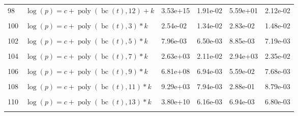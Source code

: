 \documentclass[12pt,a4paper]{article}
\DeclareMathOperator{\bc}{bc}
\DeclareMathOperator{\poly}{poly}
\begin{document}
\begin{longtable}[t]{ll>{\raggedleft\arraybackslash}p{2cm}>{\raggedleft\arraybackslash}p{2cm}>{\raggedleft\arraybackslash}p{2cm}>{\raggedleft\arraybackslash}p{2cm}}
98 & $\log(p) = c + \poly\left( \bc(t), 12 \right) + k$ & 3.53e+15 & 1.91e-02 & 5.59e+01 & 2.12e-02\\
\cellcolor{gray!6}{99} & \cellcolor{gray!6}{$\log(p) = c + \poly\left( \bc(t), 13 \right) + k$} & \cellcolor{gray!6}{3.74e+20} & \cellcolor{gray!6}{1.75e-02} & \cellcolor{gray!6}{1.96e-02} & \cellcolor{gray!6}{1.93e-02}\\
100 & $\log(p) = c + \poly\left( \bc(t), 3 \right) * k$ & 2.54e-02 & 1.34e-02 & 2.83e-02 & 1.48e-02\\
\cellcolor{gray!6}{101} & \cellcolor{gray!6}{$\log(p) = c + \poly\left( \bc(t), 4 \right) * k$} & \cellcolor{gray!6}{1.82e-02} & \cellcolor{gray!6}{1.75e-02} & \cellcolor{gray!6}{2.02e-02} & \cellcolor{gray!6}{1.95e-02}\\
102 & $\log(p) = c + \poly\left( \bc(t), 5 \right) * k$ & 7.96e-03 & 6.50e-03 & 8.85e-03 & 7.19e-03\\
\cellcolor{gray!6}{103} & \cellcolor{gray!6}{$\log(p) = c + \poly\left( \bc(t), 6 \right) * k$} & \cellcolor{gray!6}{9.83e-03} & \cellcolor{gray!6}{9.02e-03} & \cellcolor{gray!6}{1.09e-02} & \cellcolor{gray!6}{1.00e-02}\\
104 & $\log(p) = c + \poly\left( \bc(t), 7 \right) * k$ & 2.63e+03 & 2.11e-02 & 2.94e+03 & 2.35e-02\\
\cellcolor{gray!6}{105} & \cellcolor{gray!6}{$\log(p) = c + \poly\left( \bc(t), 8 \right) * k$} & \cellcolor{gray!6}{1.84e+03} & \cellcolor{gray!6}{1.50e-02} & \cellcolor{gray!6}{2.10e-02} & \cellcolor{gray!6}{1.67e-02}\\
106 & $\log(p) = c + \poly\left( \bc(t), 9 \right) * k$ & 6.81e+08 & 6.94e-03 & 5.59e-02 & 7.68e-03\\
\cellcolor{gray!6}{107} & \cellcolor{gray!6}{$\log(p) = c + \poly\left( \bc(t), 10 \right) * k$} & \cellcolor{gray!6}{4.39e+08} & \cellcolor{gray!6}{6.28e-03} & \cellcolor{gray!6}{7.19e-03} & \cellcolor{gray!6}{6.95e-03}\\
108 & $\log(p) = c + \poly\left( \bc(t), 11 \right) * k$ & 9.29e+03 & 7.94e-03 & 2.88e-01 & 8.79e-03\\
\cellcolor{gray!6}{109} & \cellcolor{gray!6}{$\log(p) = c + \poly\left( \bc(t), 12 \right) * k$} & \cellcolor{gray!6}{2.80e+06} & \cellcolor{gray!6}{7.40e-03} & \cellcolor{gray!6}{2.23e-01} & \cellcolor{gray!6}{8.20e-03}\\
110 & $\log(p) = c + \poly\left( \bc(t), 13 \right) * k$ & 3.80e+10 & 6.16e-03 & 6.94e-03 & 6.80e-03\\
\cellcolor{gray!6}{111} & \cellcolor{gray!6}{$\log(p) = c + \poly\left( \bc(t), 3 \right) + \log(k)$} & \cellcolor{gray!6}{2.67e-02} & \cellcolor{gray!6}{2.04e-02} & \cellcolor{gray!6}{2.97e-02} & \cellcolor{gray!6}{2.26e-02}\\

\end{longtable}
\end{document}
